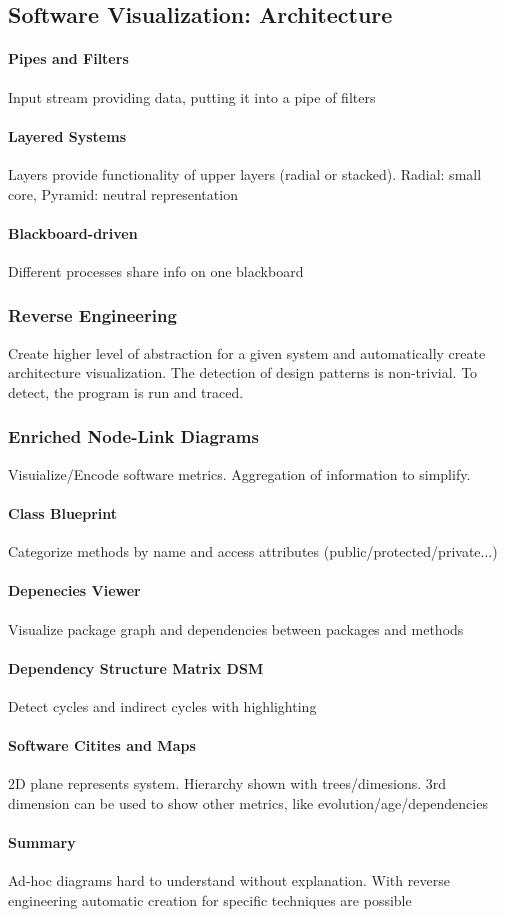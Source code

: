 \documentclass[10pt,a4paper]{article}
\begin{document}
	\subsection{Software Visualization: Architecture}
	\paragraph{Pipes and Filters} Input stream providing data, putting it into a pipe of filters
	\paragraph{Layered Systems} Layers provide functionality of upper layers (radial or stacked). Radial: small core, Pyramid: neutral representation 
	\paragraph{Blackboard-driven} Different processes share info on one blackboard
	\subsubsection{Reverse Engineering}
	Create higher level of abstraction for a given system and automatically create architecture visualization. The detection of design patterns is non-trivial. To detect, the program is run and traced. 
	\subsubsection{Enriched Node-Link Diagrams} 
	Visuialize/Encode software metrics. Aggregation of information to simplify.
	\paragraph{Class Blueprint}
	Categorize methods by name and access attributes (public/protected/private...)
	\paragraph{Depenecies Viewer}
	Visualize package graph and dependencies between packages and methods
	\paragraph{Dependency Structure Matrix DSM}
	Detect cycles and indirect cycles with highlighting
	\paragraph{Software Citites and Maps}
	2D plane represents system. Hierarchy shown with trees/dimesions. 3rd dimension can be used to show other metrics, like evolution/age/dependencies
	\paragraph{Summary}
	Ad-hoc diagrams hard to understand without explanation. With reverse engineering automatic creation for specific techniques are possible 
	
\end{document}
